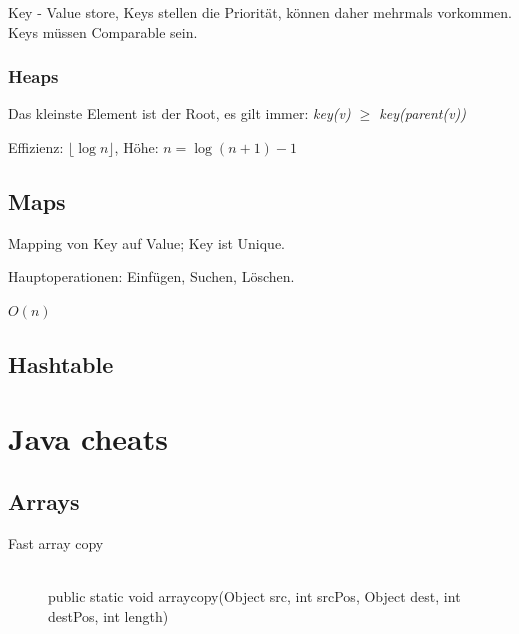 Key - Value store, Keys stellen die Priorität, können daher mehrmals vorkommen. Keys müssen Comparable sein.


\subsubsection{Heaps}

Das kleinste Element ist der Root, es gilt immer: \textit{key(v) $\geq$ key(parent(v))}

Effizienz: $\lfloor \log n \rfloor$, Höhe: $n = \log(n+1) - 1$



\subsection{Maps}

Mapping von Key auf Value; Key ist Unique.

Hauptoperationen: Einfügen, Suchen, Löschen.

$O(n)$

\subsection{Hashtable}




\section{Java cheats}
\subsection{Arrays}
\begin{description}
	
	\item[Fast array copy] \hfill \\
		public static void arraycopy(Object src, int srcPos, Object dest, int destPos, int length)

\end{description}
